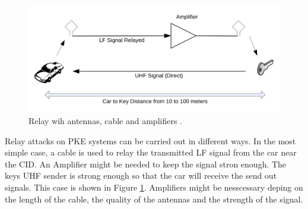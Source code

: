 	\begin{figure}[htb]
		\begin{center}
			\includegraphics[width=\textwidth]{pictures/franc_relay_over_the_wire.png}
		\end{center}
		\caption{Relay wih antennas, cable and amplifiers \citep[p. 5]{relayAttacksFranc}.}
		\label{fig:relayOTW}
	\end{figure}

	Relay  attacks on PKE systems can be carried out in different ways.
	In the most simple case,
	a cable is used to relay the transmitted LF signal from the car near the CID.
	An Amplifier might be needed to keep the signal stron enough.
	The keys UHF sender is strong enough so that the car will receive the send out signals.
	This case is shown in Figure \ref{fig:relayOTW}.
	Amplifiers might be nesscessary deping on the length of the cable,
	the quality of the antennas and the strength of the signal.

